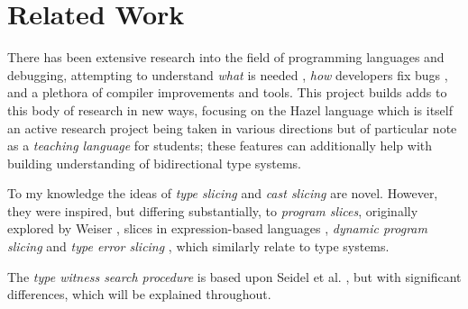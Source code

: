 \section{Related Work}
\label{sec:RelatedWork}
There has been extensive research into the field of programming languages and debugging, attempting to understand \textit{what} is needed \cite{DebugNeeds}, \textit{how} developers fix bugs \cite{HowFixBugs}, and a plethora of compiler improvements and tools. This project builds adds to this body of research in new ways, focusing on the Hazel language which is itself an active research project being taken in various directions but of particular note as a \textit{teaching language} \cite{HazelTutor} for students; these features can additionally help with building understanding of bidirectional type systems. 

To my knowledge the ideas of \textit{type slicing} and \textit{cast slicing} are novel. However, they were inspired, but differing substantially, to \textit{program slices}, originally explored by Weiser \cite{ProgSlice}, slices in expression-based languages \cite{FunctionalProgExplain}, \textit{dynamic program slicing} \cite{DynProgSlice} and \textit{type error slicing} \cite{ErrSlice, HaackErrSlice}, which similarly relate to type systems.

The \textit{type witness search procedure} is	 based upon Seidel et al. \cite{SearchProc}, but with significant differences, which will be explained throughout.